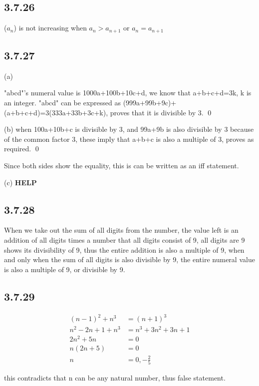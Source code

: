 \documentclass{article}
\begin{document}
\subsection*{3.7.26}

($a_n$) is not increasing when $a_n > a_{n+1}$ or $a_n = a_{n+1}$  

\subsection*{3.7.27}

(a)

"abcd"'s numeral value is 1000a+100b+10c+d, we know that a+b+c+d=3k, k is an integer. "abcd" can be expressed as (999a+99b+9c)+(a+b+c+d)=3(333a+33b+3c+k), proves that it is divisible by 3. \qed

(b) when 100a+10b+c is divisible by 3, and 99a+9b is also divisible by 3 because of the common factor 3, these imply that a+b+c is also a multiple of 3, proves as required. \qed

Since both sides show the equality, this is can be written as an iff statement.

(c) \textbf{HELP}

\subsection*{3.7.28}

When we take out the sum of all digits from the number, the value left is an addition of all digits times a number that all digits consist of 9, all digits are 9 shows its divisibility of 9, thus the entire addition is also a multiple of 9, when and only when the sum of all digits is also divisible by 9, the entire numeral value is also a multiple of 9, or divisible by 9.

\subsection*{3.7.29}

\begin{align*}
    (n-1)^2+n^3&=(n+1)^3\\
    n^2-2n+1+n^3&=n^3+3n^2+3n+1\\
    2n^2+5n&=0\\
    n(2n+5)&=0\\
    n&=0,-\frac{2}{5}
\end{align*}

this contradicts that n can be any natural number, thus false statement.
\end{document}
